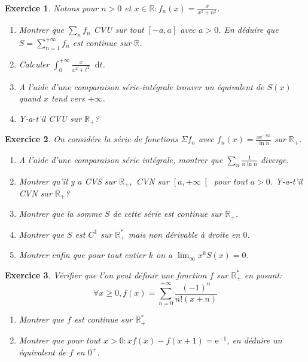 \documentclass[12pt,a4paper]{article}
\newcommand{\R}{\mathbb{R}}
\newcommand{\E}{\mathrm{e}}
\newcommand{\diff}{\mathop{}\mathopen{}\mathrm{d}}%
\theoremstyle{break}
\theoremstyle{break}
\newtheorem{Exo}{Exercice}
\begin{document}
\begin{Exo}
	Notons pour $n>0$ et $x\in\R:f_n(x)=\frac{x}{x^2+n^2}$.
	\begin{enumerate}
		\item
		Montrer que $\sum_n f_n$ CVU sur tout $[-a,a]$ avec $a>0$. En déduire que $S=\sum_{n=1}^{+\infty}f_n$ est continue sur $\R$.
		\item
		Calculer $\int_0^{+\infty}\frac{x}{x^2+t^2}\diff t$.
		\item
		A l'aide d'une comparaison série-intégrale trouver un équivalent de $S(x)$ quand $x$ tend vers $+\infty$.
		\item
		Y-a-t'il CVU sur $\R_+$?
	\end{enumerate}
\end{Exo}

\begin{Exo}
	On considére la série de fonctions $\Sigma f_{n}$ avec $%
	f_n(x) =\frac{x\E^{-nx}}{\ln n}$ sur $\R_+.$
	
	\begin{enumerate}
		\item A l'aide d'une comparaison série intégrale, montrer que $\sum_n \frac{1}{n\ln n}$ diverge.
		\item Montrer qu'il y a CVS sur $\R_{+},$ CVN sur $\left[
		a,+\infty \right[ $ pour tout $a>0$. Y-a-t'il CVN sur $\R_+$?
		\item Montrer que la somme $S$ de cette série est continue sur $\R_+$.
		\item Montrer que $S$ est $C^{1}$ sur $\R_+^*$ mais non dérivable à droite en $0$.		
		\item Montrer enfin que pour tout entier $k$ on a $\lim_{\infty
		}x^{k}S\left( x\right) =0$.
	\end{enumerate}
\end{Exo}

\begin{Exo}
	Vérifier que l'on peut définir une fonction $f$ sur $\R_+^*$ en posant:
	\[\forall x\geqslant 0,f(x)=\sum_{n=0}^{+\infty}\frac{(-1)^n}{n!(x+n)}\]
	\begin{enumerate}
		\item
		Montrer que $f$ est continue sur $\R_+^*$
		\item
		Montrer que pour tout $x>0:xf(x)-f(x+1)=\E^{-1}$, en déduire un équivalent de $f$ en $0^+$.
	\end{enumerate}
\end{Exo}
\end{document}
